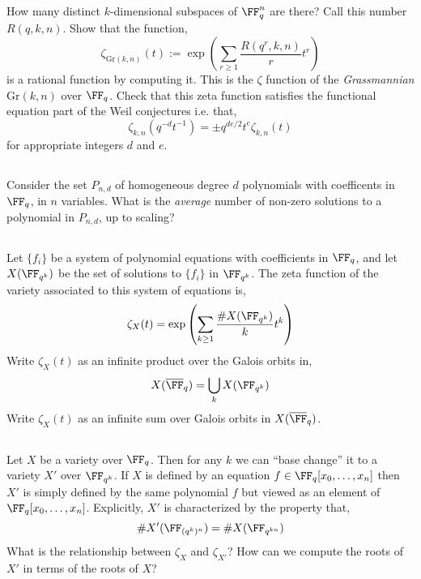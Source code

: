 \documentclass[12pt]{article}
\begin{document}
\subsection{}

\newcommand{\Gr}{\mathrm{Gr}}

How many distinct $k$-dimensional subspaces of $\FF^n_q$ are there? Call this number $R(q, k, n)$. Show that the function,
\[ \zeta_{\Gr(k,n)}(t) := \exp{\left( \sum_{r \ge 1} \frac{R(q^r, k, n)}{r} t^r \right) }\]
is a rational function by computing it. This is the $\zeta$ function of the \textit{Grassmannian} $\Gr(k, n)$ over $\FF_q$. Check that this zeta function satisfies the functional equation part of the Weil conjectures i.e. that,
\[ \zeta_{k,n}(q^{-d} t^{-1}) = \pm q^{de/2} t^e \zeta_{k,n}(t) \]
for appropriate integers $d$ and $e$.

\subsection{}

Consider the set $P_{n,d}$ of homogeneous degree $d$ polynomials with coefficents in $\FF_q$, in $n$ variables. What is the \textit{average} number of non-zero solutions to a polynomial in $P_{n,d}$, up to scaling?

\subsection{}

Let $\{ f_i \}$ be a system of polynomial equations with coefficients in $\FF_q$, and let $X(\FF_{q^k})$ be the set of solutions to $\{ f_i \}$ in $\FF_{q^k}$. The zeta function of the variety associated to this system of equations is,
\[ \zeta_X(t) = \exp{\left( \sum_{k \ge 1} \frac{\# X(\FF_{q^k})}{k} t^k \right)}\]
Write $\zeta_X(t)$ as an infinite product over the Galois orbits in,
\[ X(\overline{\FF}_q) = \bigcup_k X(\FF_{q^k}) \]
Write $\zeta_X(t)$ as an infinite sum over Galois orbits in $X(\overline{\FF}_q)$.

\subsection{} \label{base_change}

Let $X$ be a variety over $\FF_q$. Then for any $k$ we can ``base change'' it to a variety $X'$ over $\FF_{q^k}$. If $X$ is defined by an equation $f \in \FF_q[x_0, \dots, x_n]$ then $X'$ is simply defined by the same polynomial $f$ but viewed as an element of $\FF_q[x_0, \dots, x_n]$. Explicitly, $X'$ is characterized by the property that,
\[ \# X'(\FF_{(q^k)^n}) = \# X(\FF_{q^{kn}}) \]
What is the relationship between $\zeta_X$ and $\zeta_{X'}$? How can we compute the roots of $X'$ in terms of the roots of $X$?
\end{document}
